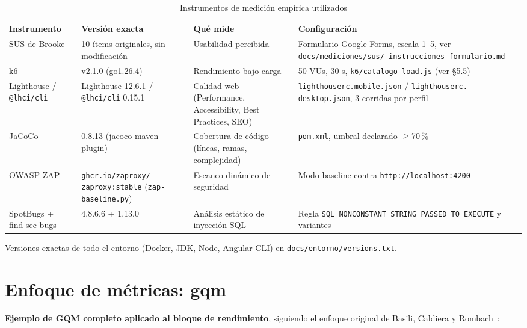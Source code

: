 \begin{table}[H]
\centering
\caption{Instrumentos de medición empírica utilizados}
\label{tab:instrumentos}
\begin{tabular}{@{}p{2.6cm}p{2.6cm}p{3.2cm}p{5.0cm}@{}}
\toprule
\textbf{Instrumento} & \textbf{Versión exacta} & \textbf{Qué mide} & \textbf{Configuración} \\
\midrule
SUS de Brooke~\cite{BROOKE1996,BANGOR2009} & 10 ítems originales, sin
  modificación & Usabilidad percibida & Formulario Google Forms, escala
  1--5, ver \texttt{docs/\allowbreak mediciones/\allowbreak sus/\allowbreak
  instrucciones-\allowbreak formulario.md} \\
k6 & v2.1.0 (go1.26.4) & Rendimiento bajo carga & 50 VUs, 30 s,
  \texttt{k6/catalogo-load.js} (ver \S5.5) \\
Lighthouse / \texttt{@lhci/cli} & Lighthouse 12.6.1 / \texttt{@lhci/cli}
  0.15.1 & Calidad web (Performance, Accessibility, Best Practices, SEO) &
  \texttt{lighthouserc.\allowbreak mobile.json} / \texttt{lighthouserc.\allowbreak
  desktop.json}, 3 corridas por perfil \\
JaCoCo~\cite{ZHU1997,INOZEMTSEVA2014} & 0.8.13 (jacoco-maven-plugin) &
  Cobertura de código (líneas, ramas, complejidad) & \texttt{pom.xml},
  umbral declarado $\geq$70\,\% \\
OWASP ZAP~\cite{OWASP2021} & \texttt{ghcr.io/\allowbreak zaproxy/\allowbreak
  zaproxy:stable} (\texttt{zap-baseline.py}) & Escaneo dinámico de
  seguridad & Modo baseline contra \texttt{http://\allowbreak localhost:4200} \\
SpotBugs + find-sec-bugs~\cite{HALFOND2005,GOULD2004} & 4.8.6.6 + 1.13.0 &
  Análisis estático de inyección SQL & Regla
  \texttt{SQL\_NONCONSTANT\_STRING\_PASSED\_TO\_EXECUTE} y variantes \\
\bottomrule
\end{tabular}
\end{table}

Versiones exactas de todo el entorno (Docker, JDK, Node, Angular CLI) en
\texttt{docs/entorno/versions.txt}.

\section{Enfoque de métricas: \gls{gqm}}

\textbf{Ejemplo de GQM completo aplicado al bloque de rendimiento}, siguiendo
el enfoque original de Basili, Caldiera y Rombach~\cite{BASILI1994}:

